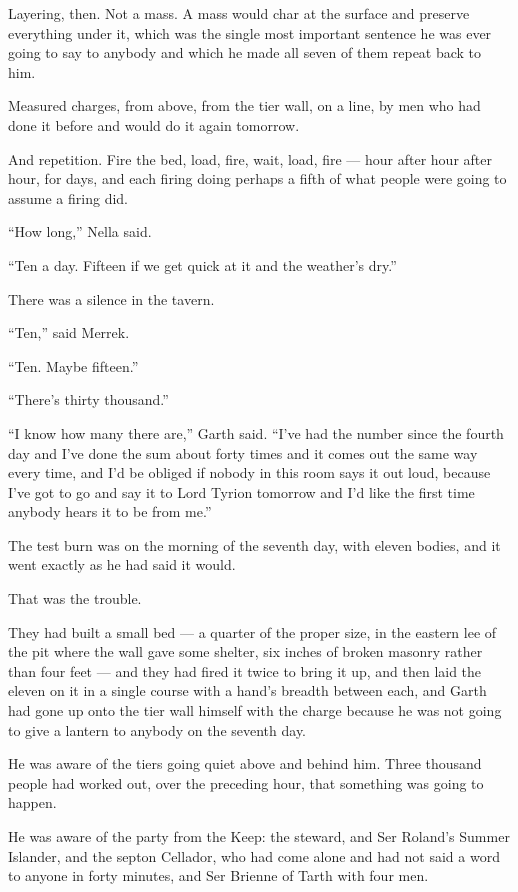 Layering, then. Not a mass. A mass would char at the surface and preserve everything under it, which was the single most important sentence he was ever going to say to anybody and which he made all seven of them repeat back to him.

Measured charges, from above, from the tier wall, on a line, by men who had done it before and would do it again tomorrow.

And repetition. Fire the bed, load, fire, wait, load, fire — hour after hour after hour, for days, and each firing doing perhaps a fifth of what people were going to assume a firing did.

“How long,” Nella said.

“Ten a day. Fifteen if we get quick at it and the weather’s dry.”

There was a silence in the tavern.

“Ten,” said Merrek.

“Ten. Maybe fifteen.”

“There’s thirty thousand.”

“I know how many there are,” Garth said. “I’ve had the number since the fourth day and I’ve done the sum about forty times and it comes out the same way every time, and I’d be obliged if nobody in this room says it out loud, because I’ve got to go and say it to Lord Tyrion tomorrow and I’d like the first time anybody hears it to be from me.”

\sceneBreak

The test burn was on the morning of the seventh day, with eleven bodies, and it went exactly as he had said it would.

That was the trouble.

They had built a small bed — a quarter of the proper size, in the eastern lee of the pit where the wall gave some shelter, six inches of broken masonry rather than four feet — and they had fired it twice to bring it up, and then laid the eleven on it in a single course with a hand’s breadth between each, and Garth had gone up onto the tier wall himself with the charge because he was not going to give a lantern to anybody on the seventh day.

He was aware of the tiers going quiet above and behind him. Three thousand people had worked out, over the preceding hour, that something was going to happen.

He was aware of the party from the Keep: the steward, and Ser Roland’s Summer Islander, and the septon Cellador, who had come alone and had not said a word to anyone in forty minutes, and Ser Brienne of Tarth with four men.

